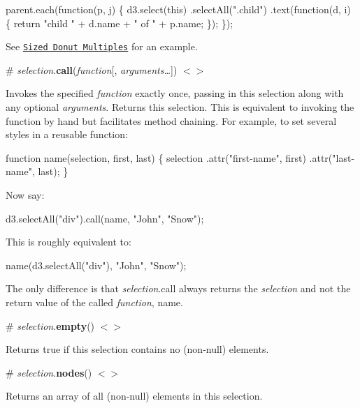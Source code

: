 \begin{DoxyCode}
parent.each(function(p, j) \{
  d3.select(this)
    .selectAll(".child")
      .text(function(d, i) \{ return "child " + d.name + " of " + p.name; \});
\});
\end{DoxyCode}


See \href{http://bl.ocks.org/mbostock/4c5fad723c87d2fd8273}{\tt Sized Donut Multiples} for an example.

\label{_selection_call}%
\# {\itshape selection}.{\bfseries call}({\itshape function}\mbox{[}, {\itshape arguments…}\mbox{]}) \href{https://github.com/d3/d3-selection/blob/master/src/selection/call.js}{\tt $<$$>$}

Invokes the specified {\itshape function} exactly once, passing in this selection along with any optional {\itshape arguments}. Returns this selection. This is equivalent to invoking the function by hand but facilitates method chaining. For example, to set several styles in a reusable function\+:


\begin{DoxyCode}
function name(selection, first, last) \{
  selection
      .attr("first-name", first)
      .attr("last-name", last);
\}
\end{DoxyCode}


Now say\+:


\begin{DoxyCode}
d3.selectAll("div").call(name, "John", "Snow");
\end{DoxyCode}


This is roughly equivalent to\+:


\begin{DoxyCode}
name(d3.selectAll("div"), "John", "Snow");
\end{DoxyCode}


The only difference is that {\itshape selection}.call always returns the {\itshape selection} and not the return value of the called {\itshape function}, {\ttfamily name}.

\label{_selection_empty}%
\# {\itshape selection}.{\bfseries empty}() \href{https://github.com/d3/d3-selection/blob/master/src/selection/empty.js}{\tt $<$$>$}

Returns true if this selection contains no (non-\/null) elements.

\label{_selection_nodes}%
\# {\itshape selection}.{\bfseries nodes}() \href{https://github.com/d3/d3-selection/blob/master/src/selection/nodes.js}{\tt $<$$>$}

Returns an array of all (non-\/null) elements in this selection.

